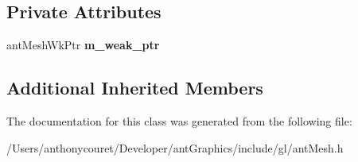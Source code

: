 \subsection*{Private Attributes}
\begin{DoxyCompactItemize}
\item 
\hypertarget{classant_mesh_aca39a8e65075996cb466d3378baf821b}{ant\+Mesh\+Wk\+Ptr {\bfseries m\+\_\+weak\+\_\+ptr}}\label{classant_mesh_aca39a8e65075996cb466d3378baf821b}

\end{DoxyCompactItemize}
\subsection*{Additional Inherited Members}


The documentation for this class was generated from the following file\+:\begin{DoxyCompactItemize}
\item 
/\+Users/anthonycouret/\+Developer/ant\+Graphics/include/gl/ant\+Mesh.\+h\end{DoxyCompactItemize}
